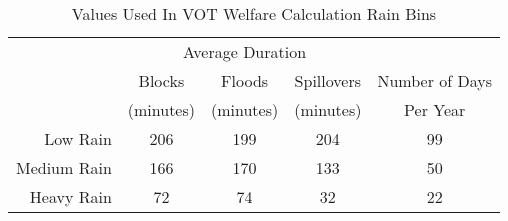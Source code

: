 \captionsetup{labelsep=newline}
\begin{table}[!htbp]
\centering

\caption{Values Used In VOT Welfare Calculation \newline Rain Bins}
\label{table:VOT-rain-desc}

  \begin{tabular}{r c c c c}
    \hline
    \hline
    & \multicolumn{3}{c}{Average Duration} &  \\
    & Blocks & Floods & Spillovers & Number of Days \\
    & (minutes) & (minutes) & (minutes) & Per Year \\
    \hline
    Low Rain & 206 & 199 & 204 & 99  \\
    Medium Rain & 166 & 170 & 133 & 50 \\
    Heavy Rain & 72 & 74 & 32 & 22 \\
    \hline
    \hline
  \end{tabular}

\end{table}
